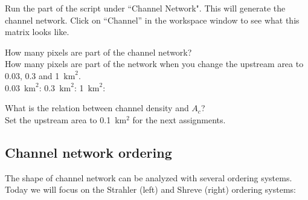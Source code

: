 \documentclass[twocolumn, 10pt, a4paper]{article}
\newenvironment{PC_prac_environment}{
\def\Q{\noindent \color{Gray}\rule[-0.1cm]{\columnwidth}{1.5pt}  \color{black} } \let\ques\Q 
\def\nQ{\noindent \color{black} } \let\ques\nQ 
\def\E{\color{Gray}\rule[0.3cm]{\columnwidth}{1.5pt} \color{black}} \let\ques\E }
\newcommand{\A}[2] { \ifthenelse{\boolean{showanswer}} {\noindent \color{cyan}{#2}\color{black}} {\multido{}{#1}{\noindent \color{light-gray}\hrulefill\\} } }
\begin{document}
\begin{PC_prac_environment}
Run the part of the script under ``Channel Network". This will generate the channel network. Click on ``Channel'' in the workspace window to see what this matrix looks like.

\Q How many pixels are part of the channel network?\\
\nQ How many pixels are part of the network when you change the upstream area to 0.03, 0.3 and 1~$\mathrm{km}^2$.\\
0.03~$\mathrm{km}^2$:  
0.3~$\mathrm{km}^2$: 
1~$\mathrm{km}^2$: 

\nQ What is the relation between channel density and $A_c$?\\
\E
\noindent Set the upstream area to 0.1~km$^2$ for the next assignments.

\subsection{Channel network ordering}
The shape of channel network can be analyzed with several ordering systems. Today we will focus on the Strahler (left) and Shreve (right) ordering systems:


\end{PC_prac_environment}
\end{document}
